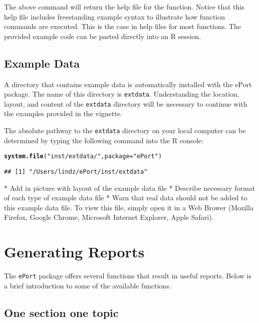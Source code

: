 \documentclass{article}\usepackage[]{graphicx}\usepackage[]{color}
\makeatletter
\newcommand{\hlstr}[1]{\textcolor[rgb]{0.192,0.494,0.8}{#1}}%
\newcommand{\hlstd}[1]{\textcolor[rgb]{0.345,0.345,0.345}{#1}}%
\newcommand{\hlkwc}[1]{\textcolor[rgb]{0.333,0.667,0.333}{#1}}%
\newcommand{\hlkwd}[1]{\textcolor[rgb]{0.737,0.353,0.396}{\textbf{#1}}}%
\newenvironment{kframe}{%
 \def\at@end@of@kframe{}%
 \ifinner\ifhmode%
  \def\at@end@of@kframe{\end{minipage}}%
  \begin{minipage}{\columnwidth}%
 \fi\fi%
 \def\FrameCommand##1{\hskip\@totalleftmargin \hskip-\fboxsep
 \colorbox{shadecolor}{##1}\hskip-\fboxsep
     \hskip-\linewidth \hskip-\@totalleftmargin \hskip\columnwidth}%
 \MakeFramed {\advance\hsize-\width
   \@totalleftmargin\z@ \linewidth\hsize
   \@setminipage}}%
 {\par\unskip\endMakeFramed%
 \at@end@of@kframe}
\newenvironment{knitrout}{}{} %
\numberwithin{equation}{section} %
\newcommand{\pkg}[1]{{\texttt{#1}}}
\newcommand{\R}{{\normalfont\textsf{R }}{}}
\makeatother
\begin{document}
The above command will return the help file for the function. Notice that this help file includes freestanding example syntax to illustrate how function commands are executed. This is the case in help files for most functions. The provided example code can be pasted directly into an \R session.

\subsection{Example Data}

A directory that contains example data is automatically installed with the ePort package. The name of this directory is \texttt{extdata}. Understanding the location, layout, and content of the \texttt{extdata} directory will be necessary to continue with the examples provided in the vignette.

The absolute pathway to the \texttt{extdata} directory on your local computer can be determined by typing the following command into the R console:

\begin{knitrout}
\color{fgcolor}\begin{kframe}
\begin{alltt}
\hlkwd{system.file}\hlstd{(}\hlstr{"inst/extdata/"}\hlstd{,} \hlkwc{package}\hlstd{=}\hlstr{"ePort"}\hlstd{)}
\end{alltt}
\begin{verbatim}
## [1] "/Users/lindz/ePort/inst/extdata"
\end{verbatim}
\end{kframe}
\end{knitrout}

* Add in picture with layout of the example data file  
* Describe necessary format of each type of example data file  
* Warn that real data should not be added to this example data file.
To view this file, simply open it in a Web Brower (Mozilla Firefox, Google Chrome, Microsoft Internet Explorer, Apple Safari).  

\section{Generating Reports}

The \pkg{ePort} package offers several functions that result in useful reports. Below is a brief introduction to some of the available functions.

\subsection{One section one topic}
\end{document}

